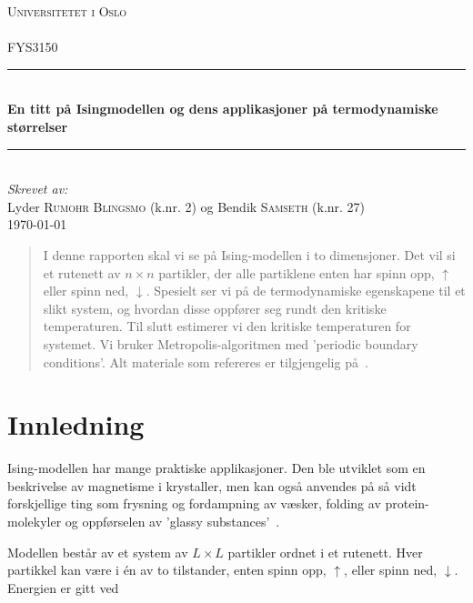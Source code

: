 \documentclass[11pt]{article}
\begin{document}
\begin{titlepage}
  \newcommand{\HRule}{\rule{\linewidth}{0.5mm}}
  \center
  \textsc{\LARGE Universitetet i Oslo}\\[1.5cm] %
  \textsc{\Large }\\[0.5cm] %
  \textsc{\large FYS3150}\\[0.5cm] %
  \HRule \\[0.4cm]
  { \huge \bfseries En titt på Isingmodellen og dens applikasjoner
  på termodynamiske størrelser}\\[0.4cm]
  \HRule \\[1.5cm]
  \Large \emph{Skrevet av:}\\
  Lyder \textsc{Rumohr Blingsmo} (k.nr. 2) og Bendik \textsc{Samseth} (k.nr. 27)\\[3cm]
  {\large \today}\\[3cm]
  \vfill
\end{titlepage}
\tableofcontents
\begin{abstract}
I denne rapporten skal vi se på Ising-modellen i to dimensjoner. Det vil si
et rutenett av $n \times n $ partikler, der alle partiklene enten har
spinn opp, $\uparrow$ eller spinn ned, $\downarrow$. Spesielt ser vi
på de termodynamiske egenskapene til et slikt system, og hvordan disse
oppfører seg rundt den kritiske temperaturen. Til slutt estimerer vi 
den kritiske temperaturen for systemet. Vi bruker Metropolis-algoritmen med 
'periodic boundary conditions'. Alt materiale som refereres er tilgjengelig 
på~\cite{github-repo}. 
\end{abstract}

\section{Innledning}
\label{sec:innledning}
Ising-modellen har mange praktiske applikasjoner. Den ble utviklet som en
beskrivelse av magnetisme i krystaller, men kan også anvendes på så vidt
forskjellige ting som frysning og fordampning av væsker, folding av 
protein-molekyler og oppførselen av 'glassy substances'~\cite{nature-ising}.

Modellen består av et system av $L \times L$ partikler ordnet i et rutenett. 
Hver partikkel kan være i én av to tilstander, enten spinn opp, $\uparrow$,
eller spinn ned, $\downarrow$. Energien er gitt ved 
\end{document}
